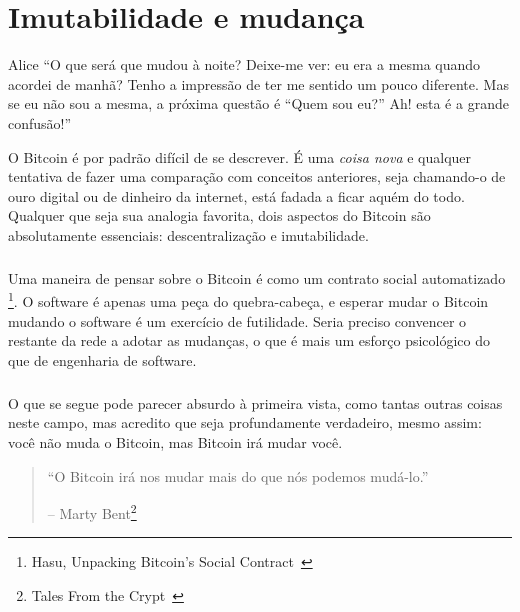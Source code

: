 \chapter{Imutabilidade e mudança}
\label{les:1}

\begin{chapquote}{Alice}
\enquote{O que será que mudou à noite? Deixe-me ver: eu era a mesma quando acordei de manhã? Tenho a impressão de ter me sentido um pouco diferente. Mas se eu não sou a mesma, a próxima questão é “Quem sou eu?” Ah! esta é a grande confusão!}
\end{chapquote}

O Bitcoin é por padrão difícil de se descrever. É uma \textit {coisa nova} e qualquer tentativa de fazer uma comparação com conceitos anteriores, seja chamando-o de ouro digital ou de dinheiro da internet, está fadada a ficar aquém do todo. Qualquer que seja sua analogia favorita, dois aspectos do Bitcoin são absolutamente essenciais: descentralização e imutabilidade.

\paragraph{}
Uma maneira de pensar sobre o Bitcoin é como um contrato social automatizado \footnote{Hasu, Unpacking Bitcoin's Social Contract~\cite {social-contract1}}. O software é apenas uma peça do quebra-cabeça, e esperar mudar o Bitcoin mudando o software é um exercício de futilidade. Seria preciso convencer o restante da rede a adotar as mudanças, o que é mais um esforço psicológico do que de engenharia de software.

\paragraph{}
O que se segue pode parecer absurdo à primeira vista, como tantas outras coisas neste campo, mas acredito que seja profundamente verdadeiro, mesmo assim: você não muda o Bitcoin, mas Bitcoin irá mudar você.

\begin{quotation}\begin{samepage}
\enquote{O Bitcoin irá nos mudar mais do que nós podemos mudá-lo.}
\begin{flushright} -- Marty Bent\footnote{Tales From the Crypt~\cite{tftc21}}
\end{flushright}\end{samepage}\end{quotation}

